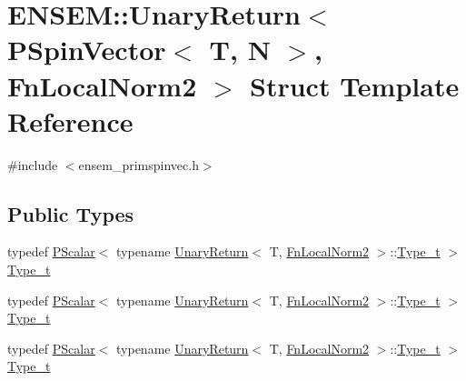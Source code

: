 \hypertarget{structENSEM_1_1UnaryReturn_3_01PSpinVector_3_01T_00_01N_01_4_00_01FnLocalNorm2_01_4}{}\section{E\+N\+S\+EM\+:\+:Unary\+Return$<$ P\+Spin\+Vector$<$ T, N $>$, Fn\+Local\+Norm2 $>$ Struct Template Reference}
\label{structENSEM_1_1UnaryReturn_3_01PSpinVector_3_01T_00_01N_01_4_00_01FnLocalNorm2_01_4}


{\ttfamily \#include $<$ensem\+\_\+primspinvec.\+h$>$}

\subsection*{Public Types}
\begin{DoxyCompactItemize}
\item 
typedef \mbox{\hyperlink{classENSEM_1_1PScalar}{P\+Scalar}}$<$ typename \mbox{\hyperlink{structENSEM_1_1UnaryReturn}{Unary\+Return}}$<$ T, \mbox{\hyperlink{structENSEM_1_1FnLocalNorm2}{Fn\+Local\+Norm2}} $>$\+::\mbox{\hyperlink{structENSEM_1_1UnaryReturn_3_01PSpinVector_3_01T_00_01N_01_4_00_01FnLocalNorm2_01_4_a0b0ee565a748d83ef4185e3d382d81de}{Type\+\_\+t}} $>$ \mbox{\hyperlink{structENSEM_1_1UnaryReturn_3_01PSpinVector_3_01T_00_01N_01_4_00_01FnLocalNorm2_01_4_a0b0ee565a748d83ef4185e3d382d81de}{Type\+\_\+t}}
\item 
typedef \mbox{\hyperlink{classENSEM_1_1PScalar}{P\+Scalar}}$<$ typename \mbox{\hyperlink{structENSEM_1_1UnaryReturn}{Unary\+Return}}$<$ T, \mbox{\hyperlink{structENSEM_1_1FnLocalNorm2}{Fn\+Local\+Norm2}} $>$\+::\mbox{\hyperlink{structENSEM_1_1UnaryReturn_3_01PSpinVector_3_01T_00_01N_01_4_00_01FnLocalNorm2_01_4_a0b0ee565a748d83ef4185e3d382d81de}{Type\+\_\+t}} $>$ \mbox{\hyperlink{structENSEM_1_1UnaryReturn_3_01PSpinVector_3_01T_00_01N_01_4_00_01FnLocalNorm2_01_4_a0b0ee565a748d83ef4185e3d382d81de}{Type\+\_\+t}}
\item 
typedef \mbox{\hyperlink{classENSEM_1_1PScalar}{P\+Scalar}}$<$ typename \mbox{\hyperlink{structENSEM_1_1UnaryReturn}{Unary\+Return}}$<$ T, \mbox{\hyperlink{structENSEM_1_1FnLocalNorm2}{Fn\+Local\+Norm2}} $>$\+::\mbox{\hyperlink{structENSEM_1_1UnaryReturn_3_01PSpinVector_3_01T_00_01N_01_4_00_01FnLocalNorm2_01_4_a0b0ee565a748d83ef4185e3d382d81de}{Type\+\_\+t}} $>$ \mbox{\hyperlink{structENSEM_1_1UnaryReturn_3_01PSpinVector_3_01T_00_01N_01_4_00_01FnLocalNorm2_01_4_a0b0ee565a748d83ef4185e3d382d81de}{Type\+\_\+t}}
\end{DoxyCompactItemize}


